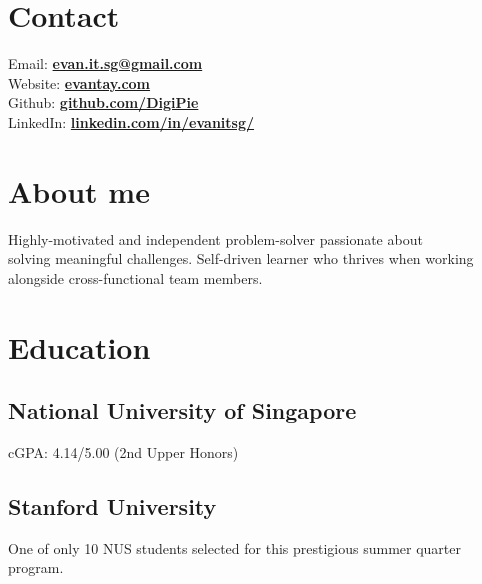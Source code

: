 \documentclass[a4paper]{resume-template} %
\begin{document}
%
%
\lastupdated

%
%
%
%

\begin{minipage}[t]{0.34\textwidth} 


\section{Contact} 
Email: \href{mailto:evan.it.sg@gmail.com}{\bf evan.it.sg@gmail.com} \\
Website: \href{https://www.evantay.com/}{\bf evantay.com} \\
Github: \href{https://github.com/DigiPie}{\bf github.com/DigiPie} \\
LinkedIn:  \href{https://www.linkedin.com/in/evanitsg/}{\bf linkedin.com/in/evanitsg/}
\sectionsep



\section{About me} 
Highly-motivated and independent problem-solver passionate about\\ solving meaningful challenges. Self-driven learner who thrives when working alongside cross-functional team members.
\sectionsep

\section{Education} 
\subsection{National University of Singapore}
cGPA: 4.14/5.00 (2nd Upper Honors)
\sectionsep
\subsection{Stanford University}
One of only 10 NUS students selected for this prestigious summer quarter program.
\sectionsep

\end{minipage}
\end{document}
